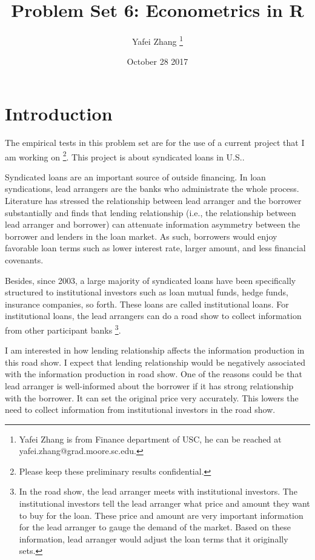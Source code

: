 \documentclass[letterpaper,12pt]{article}
\title{Problem Set 6: Econometrics in R}
\author{Yafei Zhang \thanks{Yafei Zhang is from Finance department of USC, he can be reached at yafei.zhang@grad.moore.sc.edu.}}
\date{October 28 2017}
\theoremstyle{definition}
\begin{document}
	
	\maketitle
	
	\vspace{5mm}

\section{Introduction}

The empirical tests in this problem set are for the use of a current project that I am working on \footnote{Please keep these preliminary results confidential.}. This project is about syndicated loans in U.S.. 

Syndicated loans are an important source of outside financing. In loan syndications, lead arrangers are the banks who administrate the whole process. Literature has stressed the relationship between lead arranger and the borrower substantially and finds that lending relationship (i.e., the relationship between lead arranger and borrower) can attenuate information asymmetry between the borrower and lenders in the loan market. As such, borrowers would enjoy favorable loan terms such as lower interest rate, larger amount, and less financial covenants.

Besides, since 2003, a large majority of syndicated loans have been specifically structured to institutional investors such as loan mutual funds, hedge funds, insurance companies, so forth. These loans are called institutional loans. For institutional loans, the lead arrangers can do a road show to collect information from other participant banks \footnote{In the road show, the lead arranger meets with institutional investors. The institutional investors tell the lead arranger what price and amount they want to buy for the loan. These price and amount are very important information for the lead arranger to gauge the demand of the market. Based on these information, lead arranger would adjust the loan terms that it originally sets.}.

I am interested in how lending relationship affects the information production in this road show. I expect that lending relationship would be negatively associated with the information production in road show. One of the reasons could be that lead arranger is well-informed about the borrower if it has strong relationship with the borrower. It can set the original price very accurately. This lowers the need to collect information from institutional investors in the road show.
\end{document}

